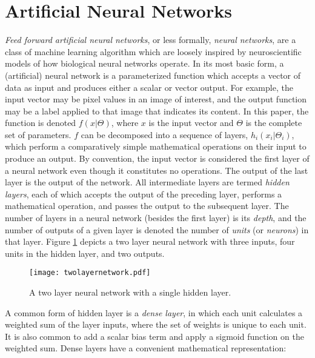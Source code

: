 \section{Artificial Neural Networks}

\textit{Feed forward artificial neural networks}, or less formally, \textit{neural networks}, are a class of machine learning algorithm which are loosely inspired by neuroscientific models of how biological neural networks operate. 
In its most basic form, a (artificial) neural network is a parameterized function which accepts a vector of data as input and produces either a scalar or vector output.
For example, the input vector may be pixel values in an image of interest, and the output function may be a label applied to that image that indicates its content.
In this paper, the function is denoted $f(x|\Theta)$, where $x$ is the input vector and $\Theta$ is the complete set of parameters.
$f$ can be decomposed into a sequence of layers, $h_i(x_i|\Theta_i)$, which perform a comparatively simple mathematical operations on their input to produce an output.
By convention, the input vector is considered the first layer of a neural network even though it constitutes no operations. 
The output of the last layer is the output of the network. 
All intermediate layers are termed \textit{hidden layers}, each of which accepts the output of the preceding layer, performs a mathematical operation, and passes the output to the subsequent layer.
The number of layers in a neural network (besides the first layer) is its \textit{depth}, and the number of outputs of a given layer is denoted the number of \textit{units} (or \textit{neurons}) in that layer.
Figure \ref{fig:twolayernetwork} depicts a two layer neural network with three inputs, four units in the hidden layer, and two outputs. 

\begin{figure}
	\centering
	\texttt{[image: twolayernetwork.pdf]}
	\caption{A two layer neural network with a single hidden layer.}
	\label{fig:twolayernetwork}
\end{figure}

A common form of hidden layer is a \textit{dense layer}, in which each unit calculates a weighted sum of the layer inputs, where the set of weights is unique to each unit.
It is also common to add a scalar bias term and apply a sigmoid function on the weighted sum.
Dense layers have a convenient mathematical representation:


